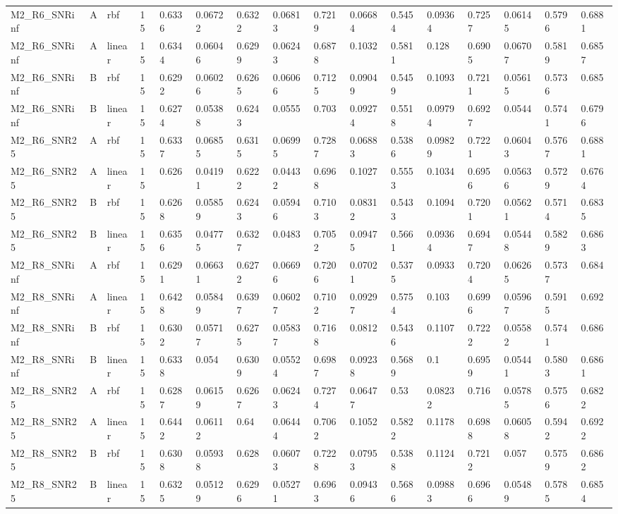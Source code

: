 \begin{tabular}{llllllllllllllll}
M2\_R6\_SNRinf & A & rbf & 15 & 0.6336 & 0.06722 & 0.6322 & 0.06813 & 0.7219 & 0.06684 & 0.5454 & 0.09364 & 0.7257 & 0.06145 & 0.5796 & 0.6881 \\
M2\_R6\_SNRinf & A & linear & 15 & 0.6344 & 0.06046 & 0.6299 & 0.06243 & 0.6878 & 0.1032 & 0.5811 & 0.128 & 0.6905 & 0.06707 & 0.5819 & 0.6857 \\
M2\_R6\_SNRinf & B & rbf & 15 & 0.6292 & 0.06026 & 0.6265 & 0.06066 & 0.7125 & 0.09049 & 0.5459 & 0.1093 & 0.7211 & 0.05615 & 0.5736 & 0.685 \\
M2\_R6\_SNRinf & B & linear & 15 & 0.6274 & 0.05388 & 0.6243 & 0.0555 & 0.703 & 0.09274 & 0.5518 & 0.09794 & 0.6927 & 0.0544 & 0.5741 & 0.6796 \\
M2\_R6\_SNR25 & A & rbf & 15 & 0.6337 & 0.06855 & 0.6315 & 0.06995 & 0.7287 & 0.06883 & 0.5386 & 0.09829 & 0.7221 & 0.06043 & 0.5767 & 0.6881 \\
M2\_R6\_SNR25 & A & linear & 15 & 0.626 & 0.04191 & 0.6222 & 0.04432 & 0.6968 & 0.1027 & 0.5553 & 0.1034 & 0.6956 & 0.05636 & 0.5729 & 0.6764 \\
M2\_R6\_SNR25 & B & rbf & 15 & 0.6268 & 0.05859 & 0.6243 & 0.05946 & 0.7103 & 0.08312 & 0.5433 & 0.1094 & 0.7201 & 0.05621 & 0.5714 & 0.6835 \\
M2\_R6\_SNR25 & B & linear & 15 & 0.6356 & 0.04775 & 0.6327 & 0.0483 & 0.7052 & 0.09475 & 0.5661 & 0.09364 & 0.6947 & 0.05448 & 0.5829 & 0.6863 \\
M2\_R8\_SNRinf & A & rbf & 15 & 0.6291 & 0.06631 & 0.6272 & 0.06696 & 0.7206 & 0.07021 & 0.5375 & 0.0933 & 0.7204 & 0.06265 & 0.5737 & 0.684 \\
M2\_R8\_SNRinf & A & linear & 15 & 0.6428 & 0.05849 & 0.6397 & 0.06027 & 0.7102 & 0.09297 & 0.5754 & 0.103 & 0.6996 & 0.05967 & 0.5915 & 0.692 \\
M2\_R8\_SNRinf & B & rbf & 15 & 0.6302 & 0.05717 & 0.6275 & 0.05837 & 0.7168 & 0.0812 & 0.5436 & 0.1107 & 0.7222 & 0.05582 & 0.5741 & 0.686 \\
M2\_R8\_SNRinf & B & linear & 15 & 0.6338 & 0.054 & 0.6309 & 0.05524 & 0.6987 & 0.09238 & 0.5689 & 0.1 & 0.6959 & 0.05441 & 0.5803 & 0.6861 \\
M2\_R8\_SNR25 & A & rbf & 15 & 0.6287 & 0.06159 & 0.6267 & 0.06243 & 0.7274 & 0.06477 & 0.53 & 0.08232 & 0.716 & 0.05785 & 0.5756 & 0.6822 \\
M2\_R8\_SNR25 & A & linear & 15 & 0.6442 & 0.06112 & 0.64 & 0.06444 & 0.7062 & 0.1052 & 0.5822 & 0.1178 & 0.6988 & 0.06058 & 0.5942 & 0.6922 \\
M2\_R8\_SNR25 & B & rbf & 15 & 0.6308 & 0.05938 & 0.628 & 0.06073 & 0.7228 & 0.07953 & 0.5388 & 0.1124 & 0.7212 & 0.057 & 0.5759 & 0.6862 \\
M2\_R8\_SNR25 & B & linear & 15 & 0.6325 & 0.05129 & 0.6296 & 0.05271 & 0.6963 & 0.09436 & 0.5686 & 0.09883 & 0.6966 & 0.05489 & 0.5785 & 0.6854 \\
\hline
\end{tabular}
